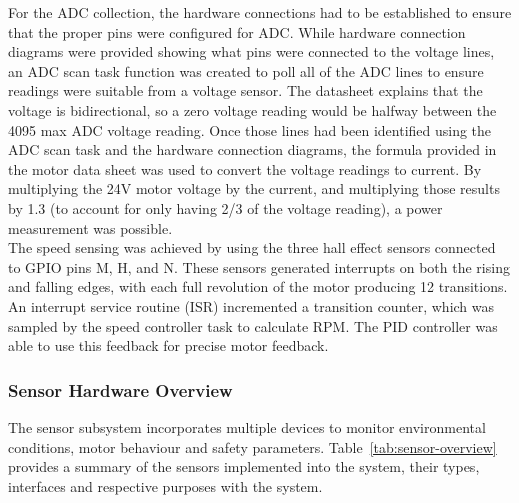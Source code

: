 \documentclass[a4paper, 11pt, titlepage]{article}
\begin{document}
For the ADC collection, the hardware connections had to be established to ensure that the proper pins were configured for ADC. While hardware connection diagrams were provided showing what pins were connected to the voltage lines, an ADC scan task function was created to poll all of the ADC lines to ensure readings were suitable from a voltage sensor. The datasheet explains that the voltage is bidirectional, so a zero voltage reading would be halfway between the 4095 max ADC voltage reading. Once those lines had been identified using the ADC scan task and the hardware connection diagrams, the formula provided in the motor data sheet \parencite{drv8323} was used to convert the voltage readings to current. By multiplying the 24V motor voltage by the current, and multiplying those results by 1.3 (to account for only having 2/3 of the voltage reading), a power measurement was possible. \\

The speed sensing was achieved by using the three hall effect sensors connected to GPIO pins M, H, and N. These sensors generated interrupts on both the rising and falling edges, with each full revolution of the motor producing 12 transitions. An interrupt service routine (ISR) incremented a transition counter, which was sampled by the speed controller task to calculate RPM. The PID controller was able to use this feedback for precise motor feedback. \\

\subsubsection{Sensor Hardware Overview}

The sensor subsystem incorporates multiple devices to monitor environmental conditions, motor behaviour and safety parameters. Table~\ref{tab:sensor-overview} provides a summary of the sensors implemented into the system, their types, interfaces and respective purposes with the system.
\end{document}
